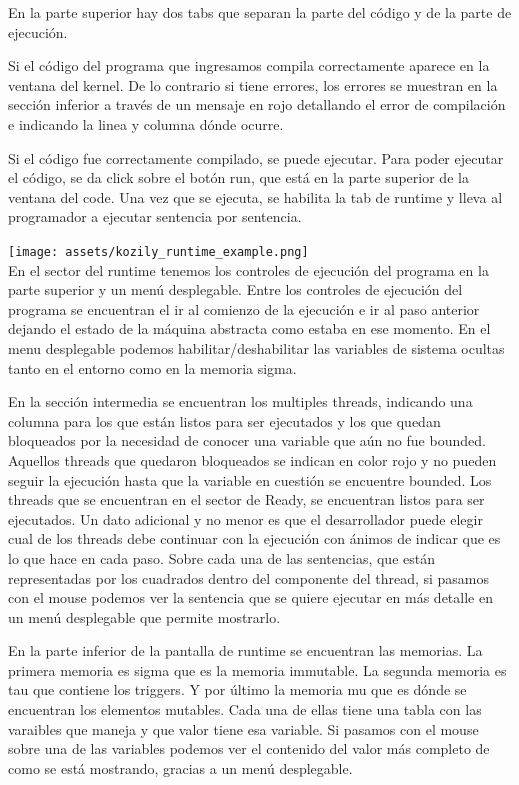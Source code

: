 \documentclass[a4paper,11pt]{article}
\begin{document}
En la parte superior hay dos tabs que separan la parte del código y de la parte de ejecución.

Si el código del programa que ingresamos compila correctamente aparece en la ventana del kernel. De lo contrario si tiene errores, los errores se muestran en la sección inferior a través de un mensaje en rojo detallando el error de compilación e indicando la linea y columna dónde ocurre.

Si el código fue correctamente compilado, se puede ejecutar.
Para poder ejecutar el código, se da click sobre el botón run, que está en la parte superior de la ventana del code.
Una vez que se ejecuta, se habilita la tab de runtime y lleva al programador a ejecutar sentencia por sentencia.

\texttt{[image: assets/kozily\_runtime\_example.png]}\\[1cm]

En el sector del runtime tenemos los controles de ejecución del programa en la parte superior y un menú desplegable. Entre los controles de ejecución del programa se encuentran el ir al comienzo de la ejecución e ir al paso anterior dejando el estado de la máquina abstracta como estaba en ese momento. En el menu desplegable podemos habilitar/deshabilitar las variables de sistema ocultas tanto en el entorno como en la memoria sigma.

En la sección intermedia se encuentran los multiples threads, indicando una columna para los que están listos para ser ejecutados y los que quedan bloqueados por la necesidad de conocer una variable que aún no fue bounded. Aquellos threads que quedaron bloqueados se indican en color rojo y no pueden seguir la ejecución hasta que la variable en cuestión se encuentre bounded.
Los threads que se encuentran en el sector de Ready, se encuentran listos para ser ejecutados.
Un dato adicional y no menor es que el desarrollador puede elegir cual de los threads debe continuar con la ejecución con ánimos de indicar que es lo que hace en cada paso.
Sobre cada una de las sentencias, que están representadas por los cuadrados dentro del componente del thread, si pasamos con el mouse podemos ver la sentencia que se quiere ejecutar en más detalle en un menú desplegable que permite mostrarlo.

En la parte inferior de la pantalla de runtime se encuentran las memorias. La primera memoria es sigma que es la memoria immutable. La segunda memoria es tau que contiene los triggers. Y por último la memoria mu que es dónde se encuentran los elementos mutables. Cada una de ellas tiene una tabla con las varaibles que maneja y que valor tiene esa variable. Si pasamos con el mouse sobre una de las variables podemos ver el contenido del valor más completo de como se está mostrando, gracias a un menú desplegable.
\end{document}
